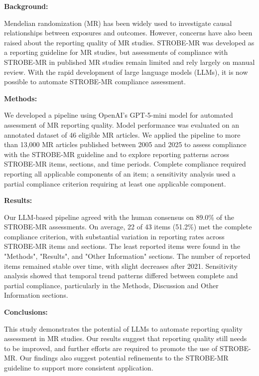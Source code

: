
\textbf{Background:}

Mendelian randomization (MR) has been widely used to investigate causal relationships between exposures and outcomes. However, concerns have also been raised about the reporting quality of MR studies. STROBE-MR was developed as a reporting guideline for MR studies, but assessments of compliance with STROBE-MR in published MR studies remain limited and rely largely on manual review. With the rapid development of large language models (LLMs), it is now possible to automate STROBE-MR compliance assessment.

\textbf{Methods:}

We developed a pipeline using OpenAI's GPT-5-mini model for automated assessment of MR reporting quality. Model performance was evaluated on an annotated dataset of 46 eligible MR articles. We applied the pipeline to more than 13,000 MR articles published between 2005 and 2025 to assess compliance with the STROBE-MR guideline and to explore reporting patterns across STROBE-MR items, sections, and time periods. Complete compliance required reporting all applicable components of an item; a sensitivity analysis used a partial compliance criterion requiring at least one applicable component.

\textbf{Results:}

Our LLM-based pipeline agreed with the human consensus on 89.0\% of the STROBE-MR assessments. On average, 22 of 43 items (51.2\%) met the complete compliance criterion, with substantial variation in reporting rates across STROBE-MR items and sections. The least reported items were found in the "Methods", "Results", and "Other Information" sections. The number of reported items remained stable over time, with slight decreases after 2021. Sensitivity analysis showed that temporal trend patterns differed between complete and partial compliance, particularly in the Methods, Discussion and Other Information sections.

\textbf{Conclusions:}

This study demonstrates the potential of LLMs to automate reporting quality assessment in MR studies. Our results suggest that reporting quality still needs to be improved, and further efforts are required to promote the use of STROBE-MR. Our findings also suggest potential refinements to the STROBE-MR guideline to support more consistent application.

